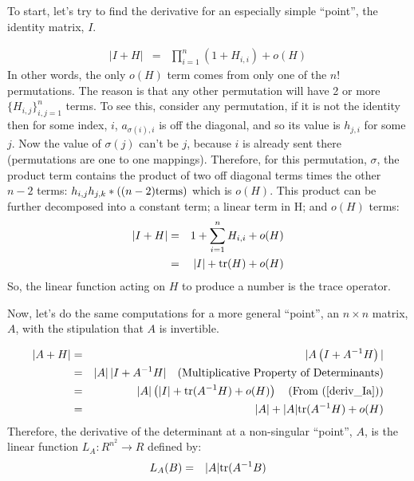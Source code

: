 \documentclass{article}
\begin{document}
To start, let's try to find the derivative for an especially simple ``point'',
the identity matrix, $I$.

\begin{eqnarray}
  |I + H| & = & \prod_{i=1}^n \left(1 + H_{i,i}\right) + o(H) \label{deriv_I}
\end{eqnarray}
In other words, the only $o(H)$ term comes from only one of the $n!$ permutations.
The reason is that any other permutation will have 2 or more $\{H_{i,j}\}_{i,j=1}^n$ terms.
To see this, consider any permutation, if it is not the identity then for some index,
$i$, $a_{\sigma(i), i}$ is off the diagonal, and so its value is $h_{j,i}$ for some $j$.
Now the value of $\sigma(j)$ can't be $j$, because $i$ is already sent there
(permutations are one to one mappings).
Therefore, for this permutation, $\sigma$, the product term contains the product of
two off diagonal terms times the other $n-2$ terms:
$h_{i,j} h_{j,k} *\left((n-2){\rm terms}\right)$ which is $o(H)$.
This product can be further decomposed into a constant term; a linear term in H;
and $o(H)$ terms:
\begin{eqnarray}
  |I + H| & = & 1 + \sum_{i=1}^n H_{i,i} + o(H) \nonumber \\
  & = & |I| + {\rm tr}(H) + o(H) \label{deriv_Ia}
\end{eqnarray}
So, the linear function acting on $H$ to produce a number is the trace operator.

Now, let's do the same computations for a more general ``point'',
an $n\times n$ matrix, $A$, with the stipulation that $A$ is invertible.

\begin{eqnarray}
  |A + H| & = & |A\left(I + A^{-1}H\right)| \nonumber \\
          & = & |A|\, |I + A^{-1}H|
                \quad \text{(Multiplicative Property of Determinants)} \nonumber \\
          & = & |A| \left(|I| + {\rm tr}(A^{-1}H) + o(H)\right)
                \quad \text{(From $(\ref{deriv_Ia})$)} \nonumber \\
  & = & |A| + |A|{\rm tr}(A^{-1}H) + o(H)
\end{eqnarray}
Therefore, the derivative of the determinant at a non-singular ``point'', $A$,
is the linear function $L_A: R^{n^2} \rightarrow R$ defined by:
\begin{eqnarray}
  L_A(B) & = & |A| {\rm tr}(A^{-1}B) \label{det_deriv}
\end{eqnarray}
\end{document}

